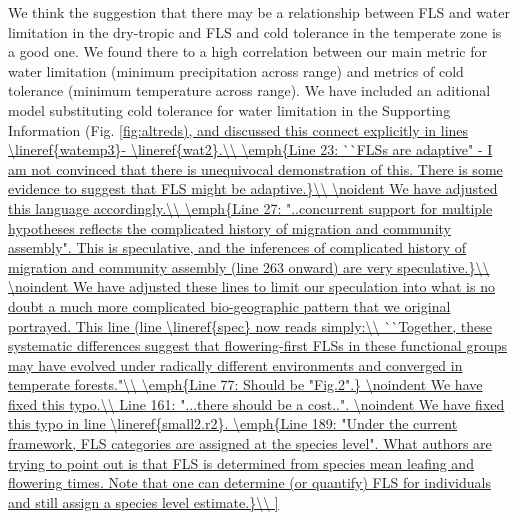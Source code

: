 \documentclass{article}[11pt]
\begin{document}
\noident We think the suggestion that there may be a relationship between FLS and water limitation in the dry-tropic and FLS and cold tolerance in the temperate zone is a good one. We found there to a high correlation between our main metric for water limitation (minimum precipitation across range) and metrics of cold tolerance (minimum temperature across range). We have included an aditional model substituting cold tolerance for water limitation in the Supporting Information (Fig. \ref{fig:altreds), and discussed this connect explicitly in lines \lineref{watemp3}- \lineref{wat2}.\\

\emph{Line 23: ``FLSs are adaptive" - I am not convinced that there is unequivocal demonstration of this. There is some evidence to suggest that FLS might be adaptive.}\\

\noident We have adjusted this language accordingly.\\

\emph{Line 27: "..concurrent support for multiple hypotheses reflects the complicated history of migration and community assembly".  This is speculative, and the inferences of complicated history of migration and community assembly (line 263 onward) are very speculative.}\\

\noindent We have adjusted these lines to limit our speculation into what is no doubt a much more complicated bio-geographic pattern that we original portrayed. This line (line \lineref{spec} now reads simply:\\
``Together, these systematic differences suggest that flowering-first FLSs in these functional groups may have evolved under radically different environments and converged in temperate forests."\\

\emph{Line 77: Should be "Fig.2".}

\noindent We have fixed this typo.\\

Line 161: "...there should be a cost..".

\noindent We have fixed this typo in line \lineref{small2.r2}.

\emph{Line 189: "Under the current framework, FLS categories are assigned at the species level". What authors are trying to point out is that FLS is determined from species mean leafing and flowering times. Note that one can determine (or quantify) FLS for individuals and still assign a species level estimate.}\\

}
\end{document}

